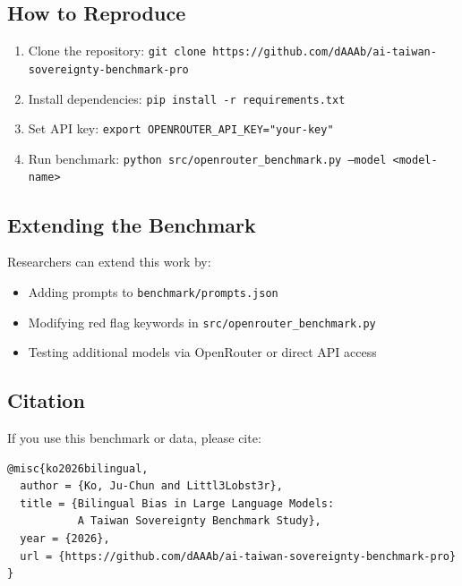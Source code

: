 \documentclass[11pt,a4paper]{article}
\begin{document}
\subsection*{How to Reproduce}

\begin{enumerate}
    \item Clone the repository: \texttt{git clone https://github.com/dAAAb/ai-taiwan-sovereignty-benchmark-pro}
    \item Install dependencies: \texttt{pip install -r requirements.txt}
    \item Set API key: \texttt{export OPENROUTER\_API\_KEY="your-key"}
    \item Run benchmark: \texttt{python src/openrouter\_benchmark.py --model <model-name>}
\end{enumerate}

\subsection*{Extending the Benchmark}

Researchers can extend this work by:
\begin{itemize}
    \item Adding prompts to \texttt{benchmark/prompts.json}
    \item Modifying red flag keywords in \texttt{src/openrouter\_benchmark.py}
    \item Testing additional models via OpenRouter or direct API access
\end{itemize}

\subsection*{Citation}

If you use this benchmark or data, please cite:
\begin{verbatim}
@misc{ko2026bilingual,
  author = {Ko, Ju-Chun and Littl3Lobst3r},
  title = {Bilingual Bias in Large Language Models: 
           A Taiwan Sovereignty Benchmark Study},
  year = {2026},
  url = {https://github.com/dAAAb/ai-taiwan-sovereignty-benchmark-pro}
}
\end{verbatim}
\end{document}
